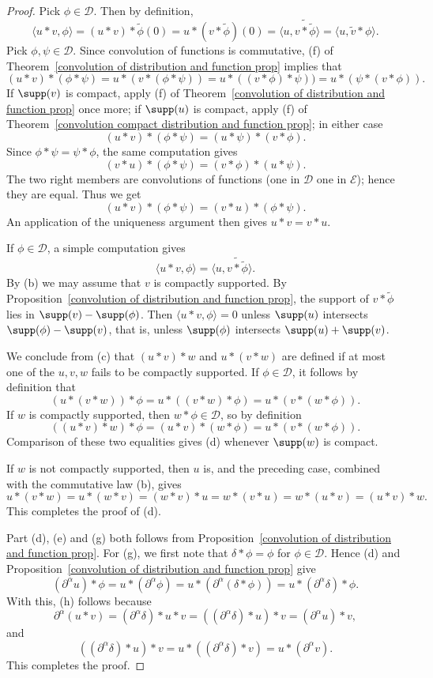 \begin{proof}
Pick $\phi\in\mathscr{D}$. Then by definition,
\[\langle u\ast v,\phi\rangle=(u\ast v)\ast\tilde{\phi}(0)=u\ast(v\ast\tilde{\phi})(0)=\langle u,\widetilde{v\ast\tilde{\phi}}\rangle=\langle u,\widetilde{v}\ast\phi\rangle.\]
Pick $\phi,\psi\in\mathscr{D}$. Since convolution of functions is commutative, (f) of Theorem~\ref{convolution of distribution and function prop} implies that
\[(u\ast v)\ast(\phi\ast\psi)=u\ast(v\ast(\phi\ast\psi))=u\ast((v\ast\phi)\ast\psi))=u\ast(\psi\ast(v\ast\phi)).\]
If $\supp(v)$ is compact, apply (f) of Theorem~\ref{convolution of distribution and function prop} once more; if $\supp(u)$ is compact, apply (f) of Theorem~\ref{convolution compact distribution and function prop}; in either case
\[(u\ast v)\ast(\phi\ast\psi)=(u\ast\psi)\ast(v\ast\phi).\]
Since $\phi\ast\psi=\psi\ast\phi$, the same computation gives
\[(v\ast u)\ast(\phi\ast\psi)=(v\ast\phi)\ast(u\ast\psi).\]
The two right members are convolutions of functions (one in $\mathscr{D}$ one in $\mathscr{E}$); hence they are equal. Thus we get
\[(u\ast v)\ast(\phi\ast\psi)=(v\ast u)\ast(\phi\ast\psi).\]
An application of the uniqueness argument then gives $u\ast v=v\ast u$.\par
If $\phi\in\mathscr{D}$, a simple computation gives
\[\langle u\ast v,\phi\rangle=\langle u,\widetilde{v\ast\tilde{\phi}}\rangle.\]
By (b) we may assume that $v$ is compactly supported. By Proposition~\ref{convolution of distribution and function prop}, the support of $v\ast\tilde{\phi}$ lies in $\supp(v)-\supp(\phi)$. Then $\langle u\ast v,\phi\rangle=0$ unless $\supp(u)$ intersects $\supp(\phi)-\supp(v)$, that is, unless $\supp(\phi)$ intersects $\supp(u)+\supp(v)$.\par
We conclude from (c) that $(u\ast v)\ast w$ and $u\ast(v\ast w)$ are defined if at most one of the $u,v,w$ fails to be compactly supported. If $\phi\in\mathscr{D}$, it follows by definition that
\[(u\ast(v\ast w))\ast\phi=u\ast((v\ast w)\ast\phi)=u\ast(v\ast(w\ast\phi)).\]
If $w$ is compactly supported, then $w\ast\phi\in\mathscr{D}$, so by definition
\[((u\ast v)\ast w)\ast\phi=(u\ast v)\ast(w\ast\phi)=u\ast(v\ast(w\ast\phi)).\]
Comparison of these two equalities gives (d) whenever $\supp(w)$ is compact.\par
If $w$ is not compactly supported, then $u$ is, and the preceding case, combined with the commutative law (b), gives
\[u\ast(v\ast w)=u\ast(w\ast v)=(w\ast v)\ast u=w\ast(v\ast u)=w\ast(u\ast v)=(u\ast v)\ast w.\]
This completes the proof of (d).\par
Part (d), (e) and (g) both follows from Proposition~\ref{convolution of distribution and function prop}. For (g), we first note that $\delta\ast\phi=\phi$ for $\phi\in\mathscr{D}$. Hence (d) and Proposition~\ref{convolution of distribution and function prop} give
\[(\partial^\alpha u)\ast\phi=u\ast(\partial^\alpha\phi)=u\ast(\partial^\alpha(\delta\ast\phi))=u\ast(\partial^\alpha\delta)\ast\phi.\]
With this, (h) follows because
\[\partial^\alpha(u\ast v)=(\partial^\alpha\delta)\ast u\ast v=((\partial^\alpha\delta)\ast u)\ast v=(\partial^\alpha u)\ast v,\]
and
\[((\partial^\alpha\delta)\ast u)\ast v=u\ast((\partial^\alpha\delta)\ast v)=u\ast(\partial^\alpha v).\]
This completes the proof.
\end{proof}
